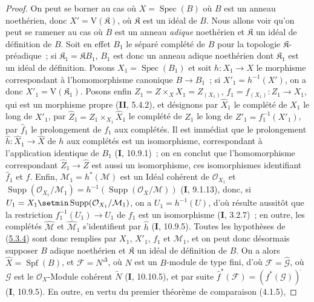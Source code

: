 \begin{proof}
On peut se borner au cas où $X=\operatorname{Spec}(B)$ où $B$ est un anneau
noethérien, donc $X'=\mathrm V(\mathfrak K)$, où $\mathfrak K$ est un idéal de
$B$. Nous allons voir qu'on peut se ramener au cas où $B$ est un anneau \emph{adique}
noethérien et $\mathfrak K$ un idéal de définition de $B$. Soit en effet $B_1$ le
séparé complété de $B$ pour la topologie $\mathfrak K$-préadique~; si
$\mathfrak K_1=\mathfrak K B_1$, $B_1$ est donc un
anneau adique noethérien dont $\mathfrak K_1$ est un idéal de définition. Posons
$X_1=\operatorname{Spec}(B_1)$ et soit $h:X_1\to X$ le morphisme correspondant à
l'homomorphisme canonique $B\to B_1$~; si $X'_1=h^{-1}(X')$, on a donc
$X'_1=\mathrm V(\mathfrak K_1)$. Posons enfin
$Z_1=Z\times_X X_1=Z_{(X_1)}$, $f_1=f_{(X_1)}:Z_1\to X_1$, qui est un morphisme
propre (\textbf{II}, 5.4.2), et désignons par $\widehat X_1$ le complété de $X_1$ le long
de $X'_1$, par
$\widehat Z_1=Z_1\times_{X_1}\widehat X_1$ le complété de $Z_1$ le long de
$Z'_1=f_1^{-1}(X'_1)$, par $\widehat f_1$ le prolongement de $f_1$ aux complétés.
Il est immédiat que le prolongement $\widehat h:\widehat X_1\to\widehat X$ de $h$
aux complétés est un isomorphisme, correspondant à l'application identique de $B_1$
(\textbf{I}, 10.9.1)~; on en conclut que l'homomorphisme correspondant
$\widehat Z_1\to\widehat Z$ est aussi un isomorphisme, ces isomorphismes identifiant
$\widehat f_1$ et $\widehat f$. Enfin,
$\mathcal M_1=h^*(\mathcal M)$ est un Idéal cohérent de $\mathcal O_{X_1}$ et
$\operatorname{Supp}(\mathcal O_{X_1}/\mathcal M_1)
=h^{-1}(\operatorname{Supp}(\mathcal O_X/\mathcal M))$
(\textbf{I}, 9.1.13), donc, si
$U_1=X_1\setmin\operatorname{Supp}(\mathcal O_{X_1}/\mathcal M_1)$, on a
$U_1=h^{-1}(U)$, d'où résulte aussitôt que la restriction
$f_1^{-1}(U_1)\to U_1$ de $f_1$ est un isomorphisme (\textbf{I}, 3.2.7)~; en outre, les
complétés $\widehat{\mathcal M}$ et $\widehat{\mathcal M}_1$ s'identifient par
$\widehat h$ (\textbf{I}, 10.9.5). Toutes les hypothèses de
(\hyperref[III.5.3.4-fr]{5.3.4}) sont donc remplies par $X_1$, $X'_1$, $f_1$ et
$\mathcal M_1$, et on peut donc désormais supposer $B$ adique noethérien et
$\mathfrak K$ un idéal de définition de $B$. On a alors
$\widehat X=\operatorname{Spf}(B)$, et $\mathcal F=N^\Delta$, où $N$ est un
$B$-module de type fini, d'où $\mathcal F=\widehat{\mathcal G}$, où $\mathcal G$
est le $\mathcal O_X$-Module cohérent $\widetilde N$ (\textbf{I}, 10.10.5), et par suite
$\widehat f^{*}(\mathcal F)=(f^*(\mathcal G))^{\widehat{\,}}$
(\textbf{I}, 10.9.5). En outre, en vertu du premier théorème de comparaison (4.1.5),

\end{proof}
